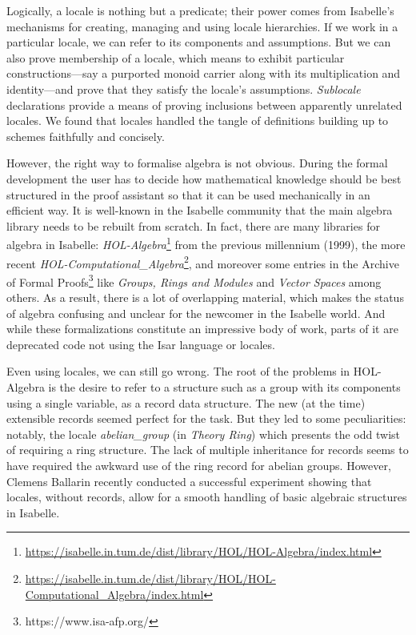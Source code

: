 \documentclass[12pt]{scrartcl}
\begin{document}
Logically, a locale is nothing but a predicate; their power comes from Isabelle's mechanisms for creating, managing and using locale hierarchies.
If we work in a particular locale, we can refer to its components and assumptions. But we can also prove membership of a locale, which means to exhibit particular constructions---say a purported monoid carrier along with its multiplication and identity---and prove that they satisfy the locale's assumptions. \emph{Sublocale} declarations provide a means of proving inclusions between apparently unrelated locales.
We found that locales handled the tangle of definitions building up to schemes faithfully and concisely.

However, the right way to formalise algebra is not obvious. During the formal development the user has to decide how mathematical knowledge should be best structured in the proof assistant so that it can be used mechanically in an efficient way.
It is well-known in the Isabelle community that the main algebra library needs to be rebuilt from scratch. In fact, there are many libraries for algebra in Isabelle: \textit{HOL-Algebra}\footnote{\url{https://isabelle.in.tum.de/dist/library/HOL/HOL-Algebra/index.html}} from the previous millennium (1999), the more recent \textit{HOL-Computational\_Algebra}\footnote{\url{https://isabelle.in.tum.de/dist/library/HOL/HOL-Computational_Algebra/index.html}}, and moreover some entries in the Archive of Formal Proofs\footnote{https://www.isa-afp.org/} like \textit{Groups, Rings and Modules} \cite{Group-Ring-Module-AFP} and \textit{Vector Spaces} \cite{VectorSpace-AFP} among others. As a result, there is a lot of overlapping material, which makes the status of algebra confusing and unclear for the newcomer in the Isabelle world. And while these formalizations constitute an impressive body of work, parts of it are deprecated code not using the Isar language or locales. 

Even using locales, we can still go wrong. The root of the problems in HOL-Algebra is the desire to refer to a structure such as a group with its components using a single variable, as a record data structure. The new (at the time) extensible records seemed perfect for the task.
But they led to some peculiarities: notably, the locale \emph{abelian\_group} (in \textit{Theory Ring}) which presents the odd twist of requiring a ring structure. The lack of multiple inheritance for records seems to have required the awkward use of the ring record for abelian groups. However, Clemens Ballarin recently conducted a successful experiment \cite{ballarin-exploring} showing that  locales, without records, allow for a smooth handling of basic algebraic structures in Isabelle. 
\end{document}
